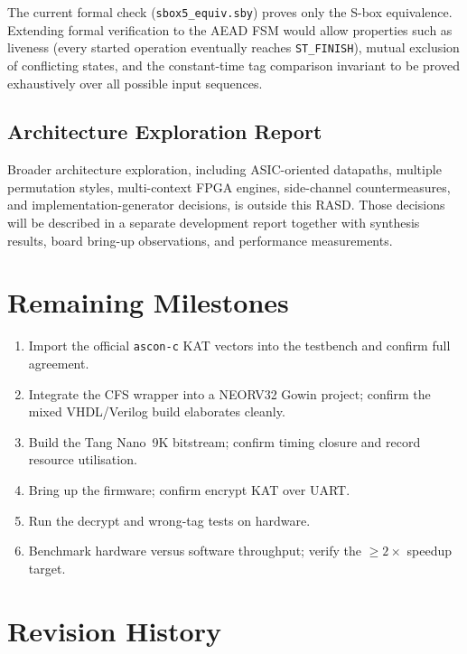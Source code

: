 \documentclass[11pt,a4paper]{article}
\begin{document}
The current formal check (\texttt{sbox5\_equiv.sby}) proves only the S-box
equivalence. Extending formal verification to the AEAD FSM would allow
properties such as liveness (every started operation eventually reaches
\texttt{ST\_FINISH}), mutual exclusion of conflicting states, and the
constant-time tag comparison invariant to be proved exhaustively over all
possible input sequences.

\subsection{Architecture Exploration Report}

Broader architecture exploration, including ASIC-oriented datapaths, multiple
permutation styles, multi-context FPGA engines, side-channel countermeasures,
and implementation-generator decisions, is outside this RASD. Those decisions
will be described in a separate development report together with synthesis
results, board bring-up observations, and performance measurements.

\section{Remaining Milestones}
\label{sec:milestones}

\begin{enumerate}
  \item Import the official \texttt{ascon-c} KAT vectors into the testbench
        and confirm full agreement.
  \item Integrate the CFS wrapper into a NEORV32 Gowin project; confirm the
        mixed VHDL/Verilog build elaborates cleanly.
  \item Build the Tang Nano~9K bitstream; confirm timing closure and record
        resource utilisation.
  \item Bring up the firmware; confirm encrypt KAT over UART.
  \item Run the decrypt and wrong-tag tests on hardware.
  \item Benchmark hardware versus software throughput; verify the $\geq 2\times$
        speedup target.
\end{enumerate}

\section*{Revision History}
\end{document}
